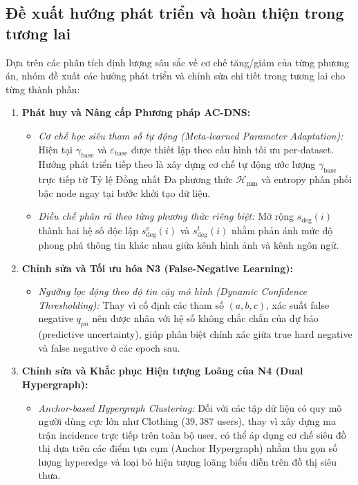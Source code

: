 \subsection{Đề xuất hướng phát triển và hoàn thiện trong tương lai}
\label{sec:negcl_future_work}

Dựa trên các phân tích định lượng sâu sắc về cơ chế tăng/giảm của từng phương án, nhóm đề xuất các hướng phát triển và chỉnh sửa chi tiết trong tương lai cho từng thành phần:

\begin{enumerate}[leftmargin=*, label=\textbf{\arabic*.}]
  \item \textbf{Phát huy và Nâng cấp Phương pháp AC-DNS:}
  \begin{itemize}[leftmargin=*]
    \item \textit{Cơ chế học siêu tham số tự động (Meta-learned Parameter Adaptation):} Hiện tại $\gamma_{\text{base}}$ và $\varepsilon_{\text{base}}$ được thiết lập theo cấu hình tối ưu per-dataset. Hướng phát triển tiếp theo là xây dựng cơ chế tự động ước lượng $\gamma_{\text{base}}$ trực tiếp từ Tỷ lệ Đồng nhất Đa phương thức $\mathcal{H}_{\text{mm}}$ và entropy phân phối bậc node ngay tại bước khởi tạo dữ liệu.
    \item \textit{Điều chế phân rã theo từng phương thức riêng biệt:} Mở rộng $s_{\text{deg}}(i)$ thành hai hệ số độc lập $s_{\text{deg}}^v(i)$ và $s_{\text{deg}}^t(i)$ nhằm phản ánh mức độ phong phú thông tin khác nhau giữa kênh hình ảnh và kênh ngôn ngữ.
  \end{itemize}

  \item \textbf{Chỉnh sửa và Tối ưu hóa N3 (False-Negative Learning):}
  \begin{itemize}[leftmargin=*]
    \item \textit{Ngưỡng lọc động theo độ tin cậy mô hình (Dynamic Confidence Thresholding):} Thay vì cố định các tham số $(a, b, c)$, xác suất false negative $q_{pn}$ nên được nhân với hệ số không chắc chắn của dự báo (predictive uncertainty), giúp phân biệt chính xác giữa true hard negative và false negative ở các epoch sau.
  \end{itemize}

  \item \textbf{Chỉnh sửa và Khắc phục Hiện tượng Loãng của N4 (Dual Hypergraph):}
  \begin{itemize}[leftmargin=*]
    \item \textit{Anchor-based Hypergraph Clustering:} Đối với các tập dữ liệu có quy mô người dùng cực lớn như Clothing ($39{,}387$ users), thay vì xây dựng ma trận incidence trực tiếp trên toàn bộ user, có thể áp dụng cơ chế siêu đồ thị dựa trên các điểm tựa cụm (Anchor Hypergraph) nhằm thu gọn số lượng hyperedge và loại bỏ hiện tượng loãng biểu diễn trên đồ thị siêu thưa.
  \end{itemize}
\end{enumerate}

